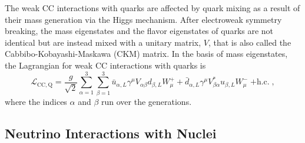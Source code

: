 The weak CC interactions with quarks are affected by quark mixing as a result of their mass generation via the Higgs mechanism. After electroweak symmetry breaking, the mass eigenstates and the flavor eigenstates of quarks are not identical but are instead mixed with a unitary matrix, $V$, that is also called the Cabbibo-Kobayashi-Maskawa (CKM) matrix. In the basis of mass eigenstates, the Lagrangian for weak CC interactions with quarks is
\begin{equation}
    \mathcal{L}_\mathrm{CC,Q} = \frac{g}{\sqrt{2}} \sum_{\alpha=1}^3 \sum_{\beta=1}^3 
    \bar{u}_{\alpha,L}\gamma^\mu V_{\alpha \beta} d_{\beta,L} W_\mu^+
     + \bar{d}_{\alpha,L}\gamma^\mu V_{\beta \alpha}^* u_{\beta,L} W_\mu^-
    \;\mathrm{+h.c.}\;,
\end{equation}
where the indices $\alpha$ and $\beta$ run over the generations. 
\subsection{Neutrino Interactions with Nuclei}
\label{sec:neutrino-xsec}


